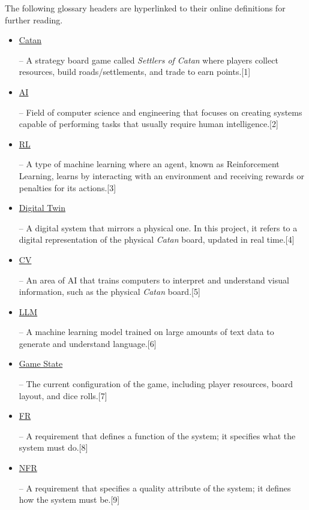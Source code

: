\documentclass[12pt, titlepage]{article}
\newcommand{\CatanExt}{\href{https://en.wikipedia.org/wiki/Catan}{Catan}}
\newcommand{\AIExt}{\href{https://en.wikipedia.org/wiki/Artificial_intelligence}{AI}}
\newcommand{\RLExt}{\href{https://www.ibm.com/think/topics/reinforcement-learning}{RL}}
\newcommand{\DigitalTwinExt}{\href{https://en.wikipedia.org/wiki/Digital_twin}{Digital Twin}}
\newcommand{\CVExt}{\href{https://www.ibm.com/think/topics/computer-vision}{CV}}
\newcommand{\LLMExt}{\href{https://www.cloudflare.com/learning/ai/what-is-large-language-model/}{LLM}}
\newcommand{\GameStateExt}{\href{https://milvus.io/ai-quick-reference/what-is-a-state-in-rl}{Game State}}
\newcommand{\NFRExt}{\href{https://en.wikipedia.org/wiki/Non-functional_requirement}{NFR}}
\newcommand{\FRExt}{\href{https://en.wikipedia.org/wiki/Functional_requirement}{FR}}
\begin{document}


The following glossary headers are hyperlinked to their online definitions for further reading.
\begin{itemize}
    \item \hypertarget{glossary-catan}{\CatanExt{}} – A strategy board game called \textit{Settlers of Catan} where players collect resources, build roads/settlements, and trade to earn points.[1]
    \item \hypertarget{glossary-ai}{\AIExt{}} – Field of computer science and engineering that focuses on creating systems capable of performing tasks that usually require human intelligence.[2]
    \item \hypertarget{glossary-rl}{\RLExt{}} – A type of machine learning where an agent, known as Reinforcement Learning, learns by interacting with an environment and receiving rewards or penalties for its actions.[3]
    \item \hypertarget{glossary-dt}{\DigitalTwinExt{}} – A digital system that mirrors a physical one. In this project, it refers to a digital representation of the physical \emph{Catan} board, updated in real time.[4]
    \item \hypertarget{glossary-cv}{\CVExt{}} – An area of AI that trains computers to interpret and understand visual information, such as the physical \emph{Catan} board.[5]
    \item \hypertarget{glossary-llm}{\LLMExt{}} – A machine learning model trained on large amounts of text data to generate and understand language.[6]
    \item \hypertarget{glossary-gamestate}{\GameStateExt{}} – The current configuration of the game, including player resources, board layout, and dice rolls.[7]
    \item \hypertarget{glossary-fr}{\FRExt{}} – A requirement that defines a function of the system; it specifies what the system must do.[8]
    \item \hypertarget{glossary-nfr}{\NFRExt{}} – A requirement that specifies a quality attribute of the system; it defines how the system must be.[9]
\end{itemize}
\end{document}
